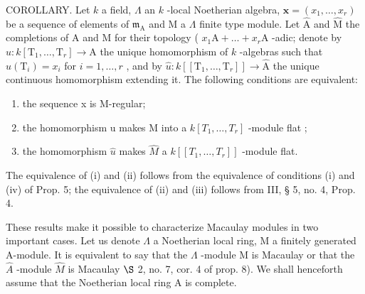 COROLLARY. Let \(k\) a field, \(\Lambda\) an \(k\) -local Noetherian algebra, \(\mathbf{x} = (x_1, \ldots, x_r)\) be a sequence of elements of \(\mathfrak{m}_{\mathrm{A}}\) and M a \(\Lambda\) finite type module. Let \(\widehat{\mathrm{A}}\) and \(\widehat{\mathrm{M}}\) the completions of A and M for their topology ( \(x_1\mathrm{A} + \ldots + x_r\mathrm{A}\) -adic; denote by \(u: k[\mathrm{T}_1, \ldots, \mathrm{T}_r] \longrightarrow \mathrm{A}\) the unique homomorphism of \(k\) -algebras such that \(u(\mathrm{T}_i) = x_i\) for \(i = 1, \ldots, r\) , and by \(\hat{u}: k[[\mathrm{T}_1, \ldots, \mathrm{T}_r]] \longrightarrow \widehat{\mathrm{A}}\) the unique continuous homomorphism extending it. The following conditions are equivalent:

\begin{enumerate}
\def\labelenumi{(\roman{enumi})}
\item
  the sequence x is M-regular;
\item
  the homomorphism u makes M into a \(k[T_{1},\ldots,T_{r}]\) -module flat ;
\item
  the homomorphism \(\hat{u}\) makes \(\hat{M}\) a \(k[[T_{1},\ldots,T_{r}]]\) -module flat.
\end{enumerate}

The equivalence of (i) and (ii) follows from the equivalence of conditions (i) and (iv) of Prop. 5; the equivalence of (ii) and (iii) follows from III, § 5, no. 4, Prop. 4.

These results make it possible to characterize Macaulay modules in two important cases. Let us denote \(\Lambda\) a Noetherian local ring, M a finitely generated A-module. It is equivalent to say that the \(\Lambda\) -module M is Macaulay or that the \(\widehat{A}\) -module \(\widehat{M}\) is Macaulay \(\S\) 2, no. 7, cor. 4 of prop. 8). We shall henceforth assume that the Noetherian local ring A is complete.


